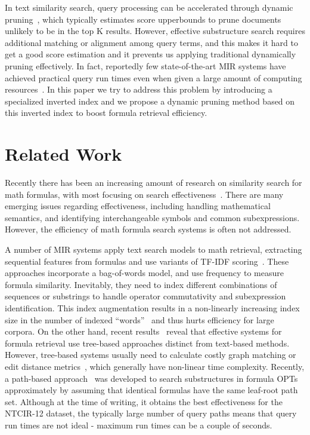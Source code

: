 \documentclass[runningheads]{llncs}
\begin{document}
In text similarity search, query processing can be accelerated through dynamic pruning~\cite{tonellotto2018efficient}, which typically estimates score upperbounds to prune documents unlikely to be in the top K results.
%
However, effective substructure search requires additional matching or alignment among query terms, and this makes it hard to get a good score estimation  and it prevents us applying traditional dynamically pruning effectively.
In fact, reportedly few state-of-the-art MIR systems have achieved practical query run times even when given a large amount of computing resources~\cite{ntcir12, mcat_16}.
In this paper we try to address this problem by introducing a specialized inverted index and we propose a dynamic pruning method based on this  inverted index to boost formula retrieval efficiency.

\section{Related Work}
\label{relatedworks}

Recently there has been an increasing amount of research on similarity search for math formulas, with most focusing on search effectiveness~\cite{a0_2019,tangent-combine2017,mcat_16,peking2016}.
There are many emerging issues regarding effectiveness, including handling mathematical semantics, and identifying interchangeable symbols and common subexpressions. However, the efficiency of math formula search systems is often not addressed.

%
A number of MIR systems apply text search models to math retrieval, extracting sequential features from formulas and use variants of TF-IDF scoring~\cite{nist_03, mias_11, peking2014}. These approaches incorporate a bag-of-words model, and use frequency to measure formula similarity. Inevitably, they need to index different combinations of sequences or substrings to handle operator commutativity and subexpression identification.
This index augmentation results in a non-linearly increasing index size in the number of indexed ``words''~\cite{peking2014} and thus hurts efficiency for large corpora.
%
On the other hand, recent results~\cite{ntcir12, a0_2019, tangent_2019} reveal that effective systems for formula retrieval use tree-based approaches distinct from text-based methods.
%
However, tree-based systems usually need to calculate costly graph matching or edit distance metrics~\cite{tangent-multistage2016, edit_dist2013}, which generally have non-linear time complexity.
Recently, a path-based approach~\cite{a0_2019} was developed to search substructures in formula OPTs approximately by assuming that identical formulas have the same leaf-root path set.
%
Although at the time of writing, it obtains the best effectiveness for the NTCIR-12 dataset, the typically large number of query paths means that query run times are not ideal  - maximum run times can be a couple of seconds.
\end{document}
